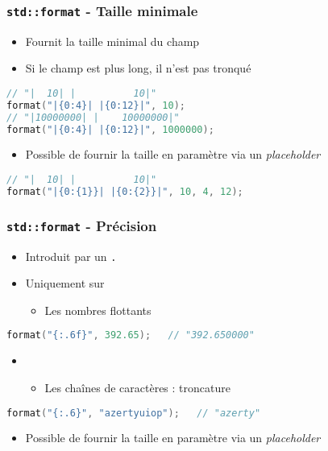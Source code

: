 \documentclass[C++.tex]{subfiles}
\begin{document}
\begin{frame}[fragile]
	\frametitle{\lstinline|std::format| - Taille minimale}
	\begin{itemize}
		\item Fournit la taille minimal du champ
		\item Si le champ est plus long, il n'est pas tronqué
	\end{itemize}

	\begin{lstlisting}[language=C++]
// "|  10| |          10|"
format("|{0:4}| |{0:12}|", 10);
// "|10000000| |    10000000|"
format("|{0:4}| |{0:12}|", 1000000);\end{lstlisting}

	\begin{itemize}
		\item Possible de fournir la taille en paramètre via un \textit{placeholder}
	\end{itemize}

	\begin{lstlisting}[language=C++]
// "|  10| |          10|"
format("|{0:{1}}| |{0:{2}}|", 10, 4, 12);\end{lstlisting}
\end{frame}

\begin{frame}[fragile]
	\frametitle{\lstinline|std::format| - Précision}
	\begin{itemize}
		\item Introduit par un \lstinline|.|
		\item Uniquement sur
		\begin{itemize}
			\item Les nombres flottants
		\end{itemize}
	\end{itemize}

	\begin{lstlisting}[language=C++]
format("{:.6f}", 392.65);   // "392.650000"\end{lstlisting}

	\begin{itemize}
		\item [] \begin{itemize}
			\item Les chaînes de caractères : troncature
		\end{itemize}
	\end{itemize}

	\begin{lstlisting}[language=C++]
format("{:.6}", "azertyuiop");   // "azerty"\end{lstlisting}

	\begin{itemize}
		\item Possible de fournir la taille en paramètre via un \textit{placeholder}
	\end{itemize}
\end{frame}
\end{document}
